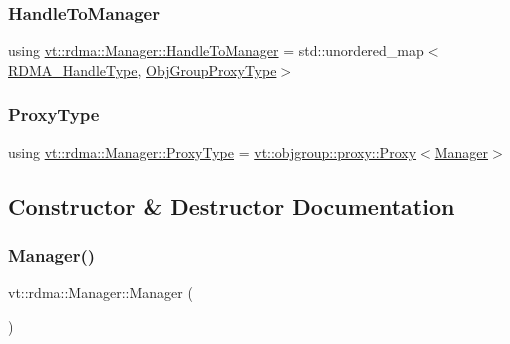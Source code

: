 \mbox{\label{structvt_1_1rdma_1_1_manager_aac6e7c58d320c302ea08461941d65f6e}} 
\subsubsection{\texorpdfstring{Handle\+To\+Manager}{HandleToManager}}
{\footnotesize\ttfamily using \hyperlink{structvt_1_1rdma_1_1_manager_aac6e7c58d320c302ea08461941d65f6e}{vt\+::rdma\+::\+Manager\+::\+Handle\+To\+Manager} =  std\+::unordered\+\_\+map$<$\hyperlink{namespacevt_a10442579ec4e7ebef223818e64bcf908}{R\+D\+M\+A\+\_\+\+Handle\+Type}, \hyperlink{namespacevt_ad7cae989df485fccca57f0792a880a8e}{Obj\+Group\+Proxy\+Type}$>$}

\mbox{\label{structvt_1_1rdma_1_1_manager_a75d5cdc6428ea19f5ec665b04dcd7166}} 
\subsubsection{\texorpdfstring{Proxy\+Type}{ProxyType}}
{\footnotesize\ttfamily using \hyperlink{structvt_1_1rdma_1_1_manager_a75d5cdc6428ea19f5ec665b04dcd7166}{vt\+::rdma\+::\+Manager\+::\+Proxy\+Type} =  \hyperlink{structvt_1_1objgroup_1_1proxy_1_1_proxy}{vt\+::objgroup\+::proxy\+::\+Proxy}$<$\hyperlink{structvt_1_1rdma_1_1_manager}{Manager}$>$}



\subsection{Constructor \& Destructor Documentation}
\mbox{\label{structvt_1_1rdma_1_1_manager_aa5d34a3c5fa988278255562eea5f8aca}} 
\subsubsection{\texorpdfstring{Manager()}{Manager()}}
{\footnotesize\ttfamily vt\+::rdma\+::\+Manager\+::\+Manager (\begin{DoxyParamCaption}{ }\end{DoxyParamCaption})}



